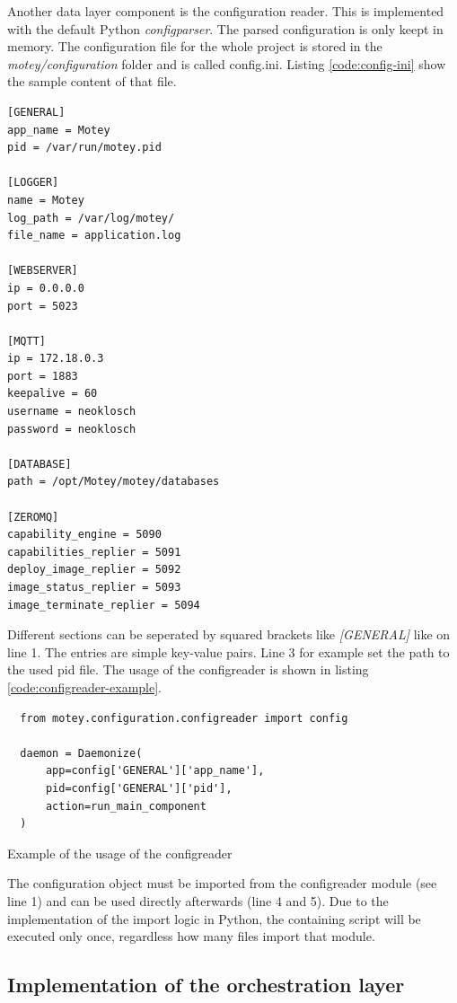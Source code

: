 Another data layer component is the configuration reader.
This is implemented with the default Python \textit{configparser}.
The parsed configuration is only keept in memory.
The configuration file for the whole project is stored in the \textit{motey/configuration} folder and is called config.ini.
Listing \ref{code:config-ini} show the sample content of that file.
\begin{verbatim}
[GENERAL]
app_name = Motey
pid = /var/run/motey.pid

[LOGGER]
name = Motey
log_path = /var/log/motey/
file_name = application.log

[WEBSERVER]
ip = 0.0.0.0
port = 5023

[MQTT]
ip = 172.18.0.3
port = 1883
keepalive = 60
username = neoklosch
password = neoklosch

[DATABASE]
path = /opt/Motey/motey/databases

[ZEROMQ]
capability_engine = 5090
capabilities_replier = 5091
deploy_image_replier = 5092
image_status_replier = 5093
image_terminate_replier = 5094
\end{verbatim}
\vspace{0.5cm}
Different sections can be seperated by squared brackets like \textit{[GENERAL]} like on line 1.
The entries are simple key-value pairs.
Line 3 for example set the path to the used pid file.
The usage of the configreader is shown in listing \ref{code:configreader-example}.

\begin{listing}[H]
  \begin{verbatim}
  from motey.configuration.configreader import config

  daemon = Daemonize(
      app=config['GENERAL']['app_name'],
      pid=config['GENERAL']['pid'],
      action=run_main_component
  )
  \end{verbatim}
  \caption{Example of the usage of the configreader}
  \label{code:configreader-example}
\end{listing}
The configuration object must be imported from the configreader module (see line 1) and can be used directly afterwards (line 4 and 5).
Due to the implementation of the import logic in Python, the containing script will be executed only once, regardless how many files import that module.

\subsection{Implementation of the orchestration layer}
\doit

